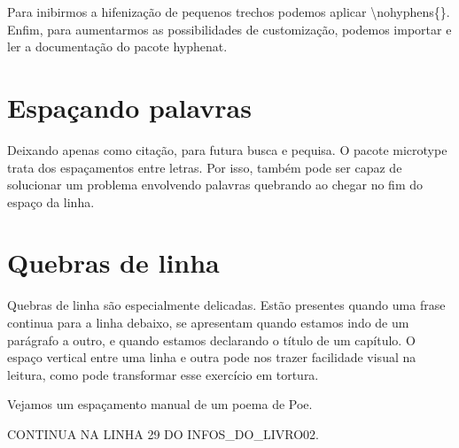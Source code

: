 Para inibirmos a hifenização de pequenos trechos podemos aplicar \textbackslash nohyphens\{\}.
Enfim, para aumentarmos as possibilidades de customização, podemos importar e ler a documentação do pacote hyphenat.

\section{Espaçando palavras}
Deixando apenas como citação, para futura busca e pequisa.
O pacote microtype trata dos espaçamentos entre letras.
Por isso, também pode ser capaz de solucionar um problema envolvendo palavras quebrando ao chegar no fim do espaço da linha.

\section{Quebras de linha}
Quebras de linha são especialmente delicadas.
Estão presentes quando uma frase continua para a linha debaixo,
se apresentam quando estamos indo de um parágrafo a outro,
e quando estamos declarando o título de um capítulo.
O espaço vertical entre uma linha e outra pode nos trazer facilidade visual na leitura,
como pode transformar esse exercício em tortura.

Vejamos um espaçamento manual de um poema de Poe.

CONTINUA NA LINHA 29 DO INFOS\_DO\_LIVRO02.

\newpage
